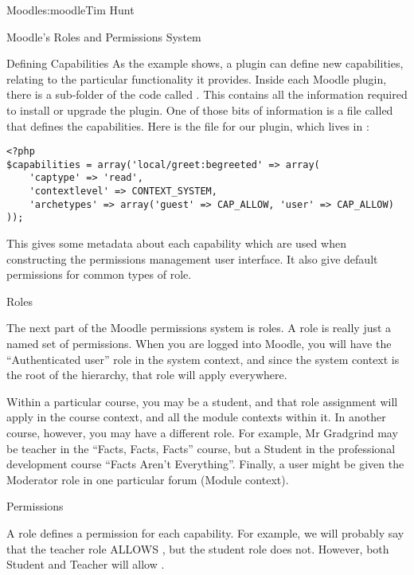 \begin{aosachapter}{Moodle}{s:moodle}{Tim Hunt}
\begin{aosasect1}{Moodle's Roles and Permissions System}
\begin{aosasect2}{Defining Capabilities}
As the example shows, a plugin can define new capabilities, relating
to the particular functionality it provides. Inside each Moodle
plugin, there is a sub-folder of the code called . This
contains all the information required to install or upgrade the
plugin. One of those bits of information is a file called
 that defines the capabilities. Here is the
 file for our plugin, which lives in
:

\begin{verbatim}
<?php
$capabilities = array('local/greet:begreeted' => array(
    'captype' => 'read',
    'contextlevel' => CONTEXT_SYSTEM,
    'archetypes' => array('guest' => CAP_ALLOW, 'user' => CAP_ALLOW)
));
\end{verbatim}

This gives some metadata about each capability which are used when
constructing the permissions management user interface. It also give
default permissions for common types of role.

\end{aosasect2}

\begin{aosasect2}{Roles}

The next part of the Moodle permissions system is roles. A role is
really just a named set of permissions. When you are logged into
Moodle, you will have the ``Authenticated user'' role in the system
context, and since the system context is the root of the hierarchy,
that role will apply everywhere.

Within a particular course, you may be a student, and that role
assignment will apply in the course context, and all the module
contexts within it. In another course, however, you may have a
different role. For example, Mr Gradgrind may be teacher in the
``Facts, Facts, Facts'' course, but a Student in the professional
development course ``Facts Aren't Everything''. Finally, a user might
be given the Moderator role in one particular forum (Module context).

\end{aosasect2}

\begin{aosasect2}{Permissions}

A role defines a permission for each capability. For example, we will
probably say that the teacher role ALLOWS ,
but the student role does not. However, both Student and Teacher will
allow .


\end{aosasect2}
\end{aosasect1}
\end{aosachapter}

